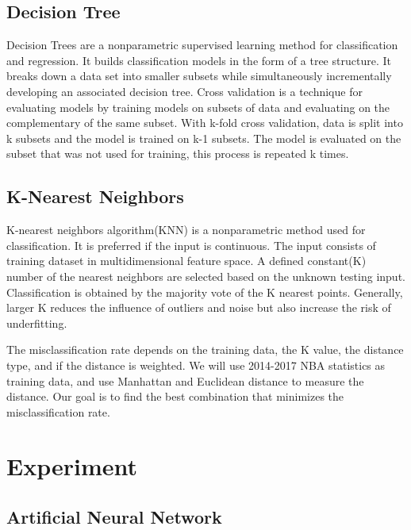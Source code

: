 \documentclass{article}
\begin{document}
\subsection{Decision Tree}
Decision Trees are a nonparametric supervised learning method for classification and regression. It builds classification models in the form of a tree structure. It breaks down a data set into smaller subsets while simultaneously incrementally developing an associated decision tree. Cross validation is a technique for evaluating models by training models on subsets of data and evaluating on the complementary of the same subset. With k-fold cross validation, data is split into k subsets and the model is trained on k-1 subsets. The model is evaluated on the subset that was not used for training, this process is repeated k times. 
  
\subsection{K-Nearest Neighbors}
K-nearest neighbors algorithm(KNN) is a nonparametric method used for classification. It is preferred if the input is continuous. The input consists of training dataset in multidimensional feature space. A defined constant(K) number of the nearest neighbors are selected based on the unknown testing input. Classification is obtained by the majority vote of the K nearest points. Generally, larger K reduces the influence of outliers and noise but also increase the risk of underfitting.

The misclassification rate depends on the training data, the K value, the distance type, and if the distance is weighted. We will use 2014-2017 NBA statistics as training data, and use Manhattan and Euclidean distance to measure the distance. Our goal is to find the best combination that minimizes the misclassification rate. 

\section{Experiment}
\subsection{Artificial Neural Network}
\end{document}
